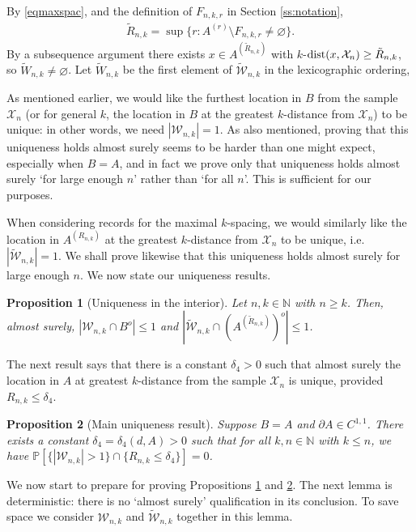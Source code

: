 \documentclass[12pt]{article}
\newcommand{\N}{\mathbb{N}}
\newcommand{\cX}{\mathcal{X}}
\newcommand{\cW}{\mathcal{W}}
\newcommand{\tcW}{\widetilde{\mathcal{W}}}
\newcommand{\tW}{\tilde{W}}
\renewcommand{\Pr}{\mathbb{P}}
\newcommand{\X}{\mathcal{X}}
\renewcommand{\emptyset}{\varnothing}
\newcommand{\tR}{{\tilde{R}}}
\newcommand{\dist}{{\rm dist}}
\newtheorem{prop}{Proposition}
\begin{document}
	By \eqref{eqmaxspac}, and the definition of $F_{n,k,r}$ in
	Section \ref{ss:notation},
	\begin{align}
		\tR_{n,k} =
	\sup\{r:  A^{(r)} \setminus F_{n,k,r} \neq \emptyset \}.
		\label{e:tRdef2}
	\end{align}
	By a subsequence argument there exists $x \in A^{(\tR_{n,k})}$
	with $k$-$\dist(x,\X_n) \geq \tR_{n,k}$, so $\tW_{n,k} \neq \emptyset$.
	Let $\tW_{n,k} $ be the first element of
	$\tcW_{n,k}$ in the lexicographic ordering,



As mentioned earlier, we would like the furthest location in $B$
from the sample $\X_n$ (or for general $k$, the
location in $B$ at the greatest $k$-distance from $\X_n$) to
be unique: in other words, we need $|\cW_{n,k}|=1$.  
As also 
mentioned, proving that this uniqueness holds almost surely seems to
be harder than one might expect, especially when $B =A$, 
and in fact we prove only that uniqueness holds almost surely
`for large enough $n$' rather than `for all $n$'.
This is sufficient for our purposes. 

When considering records for the maximal $k$-spacing,
we would similarly like the location in $A^{(R_{n,k})}$
at the greatest $k$-distance from $\X_n$ to be unique,
i.e. $|\tcW_{n,k}|=1$. We shall prove
likewise that this uniqueness holds almost surely for large enough $n$.
We now state our uniqueness results.
\begin{prop}
	[Uniqueness in the interior]
\label{lemWn}
Let $n,k \in \N$ with $ n \geq k$. Then, almost surely,
	$|\cW_{n,k} \cap B^o| \leq 1$ and 
	$|\tcW_{n,k} \cap (A^{(\tR_{n,k})})^o| \leq 1$.
\end{prop}

The next result 
 says that there is a constant $\delta_4  >0$
 such that almost surely the location in
$A$ at greatest $k$-distance from the sample $\cX_n$ is unique, provided 
$R_{n,k} \leq \delta_4 $.


\begin{prop}[Main uniqueness result]
	\label{p:uniquefurth}
	Suppose $B=A$ and $\partial A \in C^{1,1}$.
	There exists a constant $\delta_4 = \delta_4(d,A) > 0 $ such that
	for all $k, n \in \N$
	with $k \leq n$, we have $\Pr[
		\{ |\cW_{n,k}| > 1 \} \cap \{R_{n,k} \leq \delta_4\}] = 0$.
\end{prop}

We now start to prepare for proving Propositions \ref{lemWn}
and \ref{p:uniquefurth}.
The  next lemma is deterministic: there
is no `almost surely' qualification in its conclusion.
To save space we consider 
$\cW_{n,k}$ and $\tcW_{n,k}$ together in this lemma.
\end{document}
